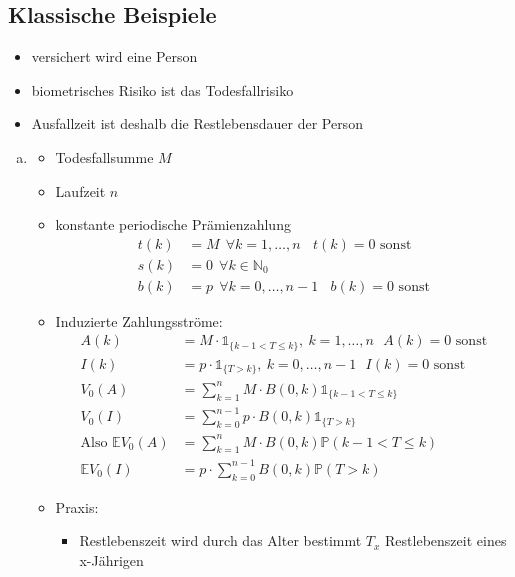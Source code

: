 \subsection{Klassische Beispiele}
\label{sub:klassische_beispiele}
\begin{itemize}
	\item versichert wird eine Person
	\item biometrisches Risiko ist das Todesfallrisiko
	\item Ausfallzeit ist deshalb die Restlebensdauer der Person
\end{itemize}
\begin{enumerate}[(a)]
	\item {}
	\begin{itemize}
		\item Todesfallsumme $M$
		\item Laufzeit $n$
		\item konstante periodische Prämienzahlung
		\begin{equation*}
		\begin{aligned}
			t(k) &= M ~~ \forall k=1,\dots,n~~~~t(k)=0 \text{ sonst}\\
			s(k) &= 0 ~~ \forall k \in \mathds{N}_0\\
			b(k) &= p ~~ \forall k=0,\dots,n-1~~~~b(k)=0 \text{ sonst}
		\end{aligned}
		\end{equation*}
		\item Induzierte Zahlungsströme:
		\begin{equation*}
		\begin{aligned}
			A(k) &= M\cdot \mathbb{1}_{\{k-1<T\le k\}},~k=1,\dots,n~~~A(k)=0 \text{ sonst}\\
			I(k) &= p\cdot \mathbb{1}_{\{T>k\}},~k=0,\dots,n-1~~~I(k)=0 \text{ sonst}\\
			V_0(A) &= \sum_{k=1}^{n}M\cdot B(0,k) \mathbb{1}_{\{k-1<T\le k \}}\\
			V_0(I) &= \sum_{k=0}^{n-1} p\cdot B(0,k) \mathbb{1}_{\{T>k \}}\\
			\text{Also } \mathds{E}V_0(A) &= \sum_{k=1}^{n}M\cdot B(0,k) \mathds{P}(k-1<T\le k)\\
			\mathds{E}V_0(I) &= p\cdot \sum_{k=0}^{n-1}B(0,k) \mathds{P}(T>k)
		\end{aligned}
		\end{equation*}
		\item Praxis:
		\begin{itemize}
			\item Restlebenszeit wird durch das Alter bestimmt $T_x$ Restlebenszeit eines x-Jährigen

\end{itemize}
\end{itemize}
\end{enumerate}
